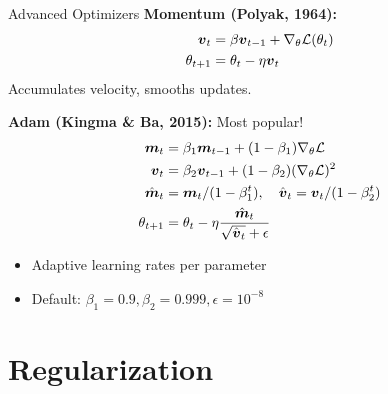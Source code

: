\documentclass[aspectratio=169]{beamer}
\begin{document}
\begin{frame}{Advanced Optimizers}
  \textbf{Momentum (Polyak, 1964):}
  \begin{align}
    \boldsymbol{v}_t &= \beta \boldsymbol{v}_{t-1} + \nabla_\theta \mathcal{L}(\theta_t) \\
    \theta_{t+1} &= \theta_t - \eta \boldsymbol{v}_t
  \end{align}
  Accumulates velocity, smooths updates.

  \vspace{0.5em}

  \textbf{Adam (Kingma \& Ba, 2015):} Most popular!
  \begin{align}
    \boldsymbol{m}_t &= \beta_1 \boldsymbol{m}_{t-1} + (1-\beta_1) \nabla_\theta \mathcal{L} \\
    \boldsymbol{v}_t &= \beta_2 \boldsymbol{v}_{t-1} + (1-\beta_2) (\nabla_\theta \mathcal{L})^2 \\
    \hat{\boldsymbol{m}}_t &= \boldsymbol{m}_t / (1-\beta_1^t), \quad \hat{\boldsymbol{v}}_t = \boldsymbol{v}_t / (1-\beta_2^t) \\
    \theta_{t+1} &= \theta_t - \eta \frac{\hat{\boldsymbol{m}}_t}{\sqrt{\hat{\boldsymbol{v}}_t} + \epsilon}
  \end{align}

  \begin{itemize}
    \item Adaptive learning rates per parameter
    \item Default: $\beta_1 = 0.9, \beta_2 = 0.999, \epsilon = 10^{-8}$
  \end{itemize}
\end{frame}

\section{Regularization}
\end{document}

